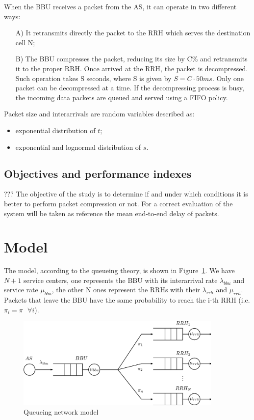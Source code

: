 \documentclass[11pt,a4paper,oneside, openright]{article}
\begin{document}
When the BBU receives a packet from the AS, it can operate in two different ways:
\begin{itemize}
	\item[A)]It retransmits directly the packet to the RRH which serves the destination cell N;
	\item[B)]The BBU compresses the packet, reducing its size by C\% and retransmits it to the proper RRH. Once arrived at the RRH, the packet is decompressed. Such operation takes S seconds, where S is given by $ S = C \cdot 50ms $. Only one packet can be decompressed at a time. If the decompressing process is busy, the incoming data packets are queued and served using a FIFO policy.
\end{itemize}

Packet size and interarrivals are random variables described as:
\begin{itemize}
	\item exponential distribution of $t$;
	\item exponential and lognormal distribution of $s$.
\end{itemize}

\subsection{Objectives and performance indexes}
???
The objective of the study is to determine if and under which conditions it is better to perform packet compression or not.
For a correct evaluation of the system will be taken as reference the mean end-to-end delay of packets.

\newpage

\section{Model}
The model, according to the queueing theory, is shown in Figure~\ref{fig:model}.
We have $ N + 1 $ service centers, one represents the BBU with its interarrival rate $ \lambda_{bbu} $ and service rate $ \mu_{bbu} $, the other N ones represent the RRHs with their $ \lambda_{rrh} $ and $ \mu_{rrh} $. Packets that leave the BBU have the same probability to reach the i-th RRH (i.e. $ \pi_{i} = \pi \text{ } \forall i $).
\begin{figure}[h]
	\centering
	\includegraphics[width=0.9\textwidth]{images/model}
	\caption{Queueing network model}
	\label{fig:model}
\end{figure}
\end{document}
